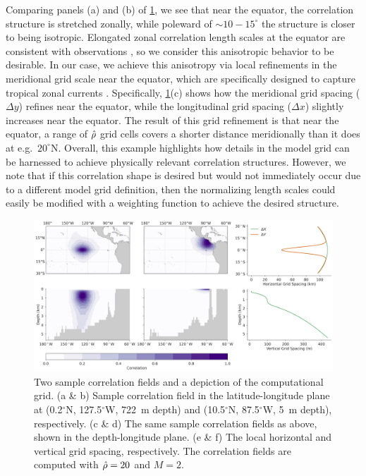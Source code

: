 Comparing panels (a) and (b) of \cref{fig:llc90_correlation_maps}, we see that
near the equator, the correlation structure is stretched zonally, while poleward
of $\sim 10-15^\circ$ the structure is closer to being isotropic.
Elongated zonal correlation length scales at the equator are consistent with
observations \citep{meyers_space_1991}, so we
consider this anisotropic behavior to be desirable.
In our case, we achieve this anisotropy via local refinements in the
meridional grid scale near the equator, which are specifically designed to
capture tropical zonal currents \citep{forgetECCOv4}.
Specifically, \cref{fig:llc90_correlation_maps}(c) shows how the meridional grid
spacing ($\Delta y$) refines near the equator, while the longitudinal grid
spacing ($\Delta x$) slightly increases near the equator.
The result of this grid refinement is that near the equator, a range of
$\hat{\rho}$ grid cells covers a shorter distance meridionally than it does at
e.g.\ $20^\circ$N.
Overall, this example highlights how details in the model grid can be harnessed
to achieve physically relevant correlation structures.
However, we note that if this correlation shape is desired but would not
immediately occur due to a different model grid definition, then the normalizing length
scales could easily be modified with a weighting function to achieve the
desired structure.

\begin{figure}
    \centering
    \includegraphics[width=\textwidth]{../figures/huge_correlation_map_02apps.jpg}
    \caption{Two sample correlation fields and a depiction of the computational
        grid.
        (a \& b) Sample correlation field in the latitude-longitude plane at
        (0.2$^\circ$N, 127.5$^\circ$W, 722~m depth) and
        (10.5$^\circ$N, 87.5$^\circ$W, 5~m depth), respectively.
        (c \& d) The same sample correlation fields as above, shown in the
        depth-longitude plane.
        (e \& f) The local horizontal and vertical grid spacing, respectively.
        The correlation fields are computed with $\hat{\rho} = 20$ and $M=2$.
    }
    \label{fig:llc90_correlation_maps}
\end{figure}

